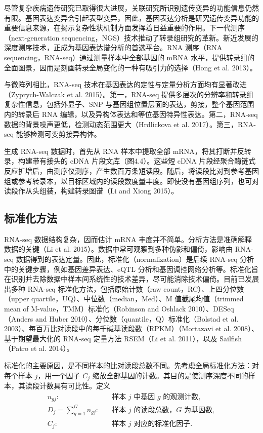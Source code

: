 尽管复杂疾病遗传研究已取得很大进展，关联研究所识别遗传变异的功能信息仍然有限。基因表达变异会引起表型变异，因此，基因表达分析是研究遗传变异功能的重要信息来源，在揭示复杂性状机制方面发挥着日益重要的作用。下一代测序（next-generation sequencing，NGS）技术推动了转录组研究的革新。新近发展的深度测序技术，正成为基因表达谱分析的首选平台。RNA 测序（RNA sequencing，RNA-seq）通过测量样本中全部基因的 mRNA 水平，提供转录组的全面图景，因而是刻画转录全局变化的一种有吸引力的选择（Hong et al. 2013）。

与微阵列相比，RNA-seq 技术在基因表达的定性与定量分析方面均有显著改进（Zyprych-Walczak et al. 2015）。第一，RNA-seq 提供多层次的分辨率和转录组复杂性信息，包括外显子、SNP 与基因组位置层面的表达，剪接，整个基因范围内的转录后 RNA 编辑，以及异构体表达和等位基因特异性表达。第二，RNA-seq 数据的背景噪声更低，检测动态范围更大（Hrdlickova et al. 2017）。第三，RNA-seq 能够检测可变剪接异构体。

生成 RNA-seq 数据时，首先从 RNA 样本中提取全部 mRNA，将其打断并反转录，构建带有接头的 cDNA 片段文库（图4.4）。这些短 cDNA 片段经聚合酶链式反应扩增后，由测序仪测序，产生数百万条短读段。随后，将读段比对到参考基因组或参考转录本，以目标区域内的读段数度量丰度。即使没有基因组序列，也可对读段作从头组装，构建转录图谱（Li and Xiong 2015）。


\FloatBarrier

\subsection{标准化方法}

RNA-seq 数据结构复杂，因而估计 mRNA 丰度并不简单。分析方法是准确解释数据的关键（Li et al. 2015）。数据中常可观察到多种伪影和偏倚，影响由 RNA-seq 数据得到的表达定量。因此，标准化（normalization）是后续 RNA-seq 分析中的关键步骤，例如基因差异表达、eQTL 分析和基因调控网络分析等。标准化旨在识别并去除数据中样本间系统性的技术差异，尽可能消除技术偏倚。目前已发展出多种 RNA-seq 标准化方法，包括原始计数（raw count，RC）、上四分位数（upper quartile，UQ）、中位数（median，Med）、M 值截尾均值（trimmed mean of M-value，TMM）标准化（Robinson and Oshlack 2010）、DESeq（Anders and Huber 2010）、分位数（quantile，Q）标准化（Bolstad et al. 2003）、每百万比对读段中的每千碱基读段数（RPKM）（Mortazavi et al. 2008）、基于期望最大化的 RNA-seq 定量方法 RSEM（Li et al. 2011），以及 Sailfish（Patro et al. 2014）。

标准化的主要原因，是不同样本的比对读段总数不同。先考虑全局标准化方法：对每个样本 $j$，用一个因子 $C_j$ 缩放全部基因的计数。其目的是使测序深度不同的样本，其读段计数具有可比性。定义
\[
\begin{aligned}
n_{gj}:&\quad\text{样本 }j\text{ 中基因 }g\text{ 的观测计数},\\
D_j=\sum_{g=1}^{G}n_{gj}:&\quad\text{样本 }j\text{ 的读段总数，}G\text{ 为基因数},\\
C_j:&\quad\text{样本 }j\text{ 对应的标准化因子}.
\end{aligned}
\]

